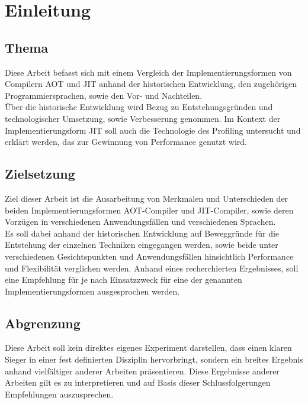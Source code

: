 \chapter{Einleitung}

\section{Thema}
Diese Arbeit befasst sich mit einem Vergleich der Implementierungsformen von Compilern \ac{AOT} und \ac{JIT} anhand der historischen Entwicklung, den zugehörigen Programmiersprachen, sowie den Vor- und Nachteilen. \\
Über die historische Entwicklung wird Bezug zu Entstehungsgründen und technologischer Umsetzung, sowie Verbesserung genommen. Im Kontext der Implementierungsform \ac{JIT} soll auch die Technologie des Profiling untersucht und erklärt werden, das zur Gewinnung von Performance genutzt wird.

\section{Zielsetzung}


Ziel dieser Arbeit ist die Ausarbeitung von Merkmalen und Unterschieden der beiden Implementierungsformen \ac{AOT}-Compiler und \ac{JIT}-Compiler, sowie deren Vorzügen in verschiedenen Anwendungsfällen und verschiedenen Sprachen. \\
Es soll dabei anhand der historischen Entwicklung auf Beweggründe für die Entstehung der einzelnen Techniken eingegangen werden, sowie beide unter verschiedenen Gesichtspunkten und Anwendungsfällen hinsichtlich Performance und Flexibilität verglichen werden. 
Anhand eines recherchierten Ergebnisses, soll eine Empfehlung für je nach Einsatzzweck für eine der genannten Implementierungsformen ausgesprochen werden.



\section{Abgrenzung}
Diese Arbeit soll kein direktes eigenes Experiment darstellen, dass einen klaren Sieger in einer fest definierten Disziplin hervorbringt, sondern ein breites Ergebnis anhand vielfältiger anderer Arbeiten präsentieren. 
Diese Ergebnisse anderer Arbeiten gilt es zu interpretieren und auf Basis dieser Schlussfolgerungen Empfehlungen auszusprechen.